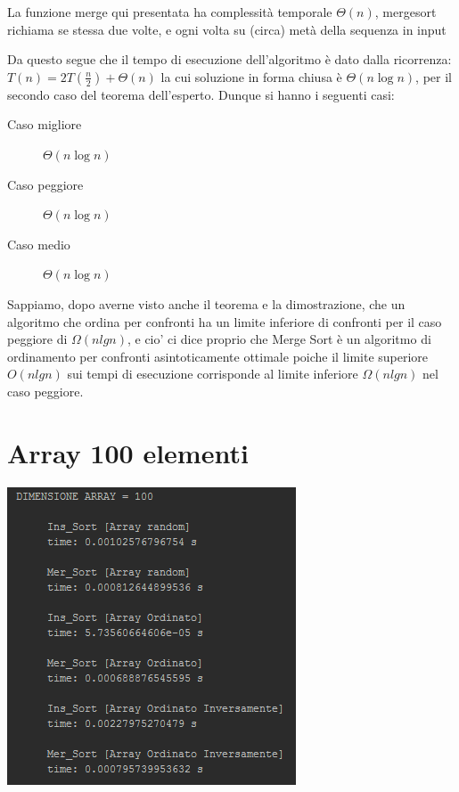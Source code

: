 \documentclass{article}
\begin{document}
La funzione merge qui presentata ha complessità temporale  $\Theta (n)$,
mergesort richiama se stessa due volte, e ogni volta su (circa) metà della sequenza in input


Da questo segue che il tempo di esecuzione dell'algoritmo è dato dalla ricorrenza: $T(n)=2T\left({\frac  {n}{2}}\right)+\Theta (n)$ la cui soluzione in forma chiusa è $\Theta (n\log n)$, per il secondo caso del teorema dell'esperto.
Dunque si hanno i seguenti casi:
\begin{description}

        \item[Caso migliore] $\Theta (n\log n)$
        
        \item[Caso peggiore] $\Theta (n\log n)$
        
        \item[Caso medio] $\Theta (n\log n)$
        
\end{description}
Sappiamo, dopo averne visto anche il teorema e la dimostrazione, che un algoritmo che ordina per confronti ha un limite inferiore di confronti per il caso peggiore di $\Omega (nlgn)$, e cio' ci dice proprio che Merge Sort è un algoritmo di ordinamento per confronti asintoticamente ottimale poiche il limite superiore $O(nlgn)$ sui tempi di esecuzione corrisponde al limite inferiore $\Omega (nlgn)$ nel caso peggiore.

\section{Array 100 elementi}
\begin{center}
\includegraphics{photo100.png}
\end{center}
\end{document}
